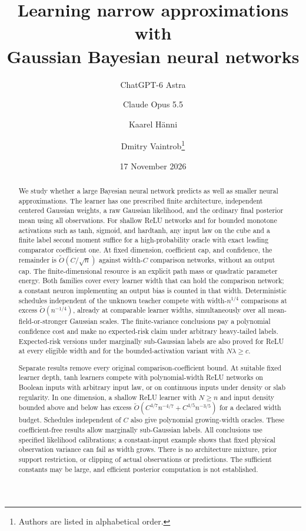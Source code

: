 \documentclass[11pt]{article}
\title{Learning narrow approximations with\\Gaussian Bayesian neural networks}
\author{ChatGPT-6 Astra \and Claude Opus 5.5 \and Kaarel H\"anni \and
Dmitry Vaintrob\thanks{Authors are listed in alphabetical order.}}
\date{17 November 2026}
\theoremstyle{remark}\newtheorem{remark}[theorem]{Remark}
\begin{document}
\maketitle
\begin{abstract}
We study whether a large Bayesian neural network predicts as well as
smaller neural approximations. The learner has one prescribed finite
architecture, independent centered Gaussian weights, a raw Gaussian
likelihood, and the ordinary final posterior mean using all observations.
For shallow ReLU networks and for bounded monotone activations such as
tanh, sigmoid, and hardtanh, any input law on the cube and a finite
label second moment suffice for a high-probability oracle with exact
leading comparator coefficient one. At fixed dimension, coefficient
cap, and confidence, the remainder is $\widetilde O(C/\sqrt n)$
against width-$C$ comparison networks, without an output cap.
The finite-dimensional resource is an explicit path mass or quadratic
parameter energy. Both families cover every learner width that can hold the comparison
network; a constant neuron implementing an output bias is counted in
that width. Deterministic schedules independent of the unknown teacher
compete with width-$n^{1/4}$ comparisons at excess
$\widetilde O(n^{-1/4})$, already at comparable learner widths,
simultaneously over all mean-field-or-stronger Gaussian scales.
The finite-variance conclusions pay a polynomial confidence cost and
make no expected-risk claim under arbitrary heavy-tailed labels.
Expected-risk versions under marginally sub-Gaussian labels are
also proved for ReLU at every eligible width and for the bounded-activation
variant with $N\lambda\ge c$.

Separate results remove every original comparison-coefficient bound.
At suitable fixed learner depth, tanh learners compete with
polynomial-width ReLU networks on Boolean inputs with arbitrary input
law, or on continuous inputs under density or slab regularity.
In one dimension, a shallow ReLU learner with $N\ge n$ and input
density bounded above and below has excess
$\widetilde O(C^{4/7}n^{-4/7}+C^{4/5}n^{-3/5})$ for a declared width
budget. Schedules independent of $C$ also give polynomial growing-width
oracles. These coefficient-free results allow marginally sub-Gaussian
labels. All conclusions use specified likelihood calibrations; a
constant-input example shows that fixed physical observation variance
can fail as width grows. There is no architecture mixture, prior support
restriction, or clipping of actual observations or predictions.
The sufficient constants may be large, and efficient posterior
computation is not established.
\end{abstract}
\end{document}
